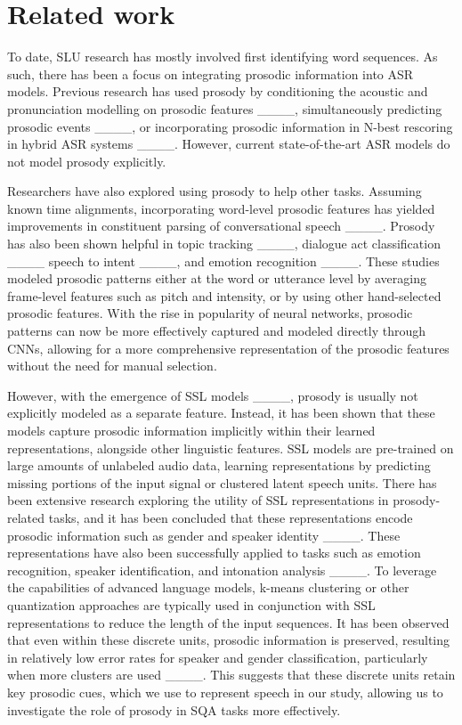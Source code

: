 \section{Related work}
To date, SLU research has mostly involved first identifying word sequences.  As such, there has been a focus on integrating prosodic information into ASR models. Previous research has used prosody by conditioning the acoustic and pronunciation modelling on prosodic features ____, simultaneously predicting prosodic events ____, or incorporating prosodic information in N-best rescoring in hybrid ASR systems ____. However, current state-of-the-art ASR models do not model prosody explicitly. 

Researchers have also explored using prosody to help other tasks.  Assuming known time alignments, incorporating word-level prosodic features has yielded improvements in constituent parsing of conversational speech ____. Prosody has also been shown helpful in topic tracking ____, dialogue act classification ____ speech to intent ____, and emotion recognition ____. These studies modeled prosodic patterns either at the word or utterance level by averaging frame-level features such as pitch and intensity, or by using other hand-selected prosodic features. With the rise in popularity of neural networks, prosodic patterns can now be more effectively captured and modeled directly through CNNs, allowing for a more comprehensive representation of the prosodic features without the need for manual selection. 

However, with the emergence of SSL models ____, prosody is usually not explicitly modeled as a separate feature. Instead, it has been shown that these models capture prosodic information implicitly within their learned representations, alongside other linguistic features. SSL models are pre-trained on large amounts of unlabeled audio data, learning representations by predicting missing portions of the input signal or clustered latent speech units. There has been extensive research exploring the utility of SSL representations in prosody-related tasks, and it has been concluded that these representations encode prosodic information such as gender and speaker identity ____. These representations have also been successfully applied to tasks such as emotion recognition, speaker identification, and intonation analysis ____. To leverage the capabilities of advanced language models, k-means clustering or other quantization approaches are typically used in conjunction with SSL representations to reduce the length of the input sequences. It has been observed that even within these discrete units, prosodic information is preserved, resulting in relatively low error rates for speaker and gender classification, particularly when more clusters are used ____. This suggests that these discrete units retain key prosodic cues, which we use to represent speech in our study, allowing us to investigate the role of prosody in SQA tasks more effectively.